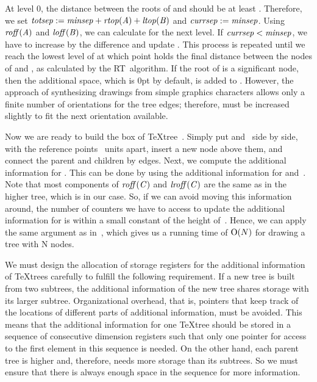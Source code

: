 At level 0, the distance between the roots of  and 
should be at least . Therefore, we set
${\it totsep\/}:={\it minsep\/} + {\it rtop\/}({\it A\/})
+ {\it ltop\/}({\it B\/})$ and ${\it currsep\/}:={\it minsep\/}$.
Using ${\it roff\/}({\it A\/})$ and ${\it loff\/}({\it B\/})$, we can
calculate  for the next level.
If ${\it currsep\/} < {\it minsep\/}$, we have to increase  by
the difference and update . This process is
repeated until we reach the lowest level of 
at which point  holds the final distance between the
nodes of  and , as calculated by the RT~algorithm.
If the root of  is a significant node, then the additional space,
which is 0pt by default, is added to .
However, the approach of synthesizing
drawings from simple graphics characters allows only a finite
number of orientations for the tree edges; therefore, 
must be increased slightly to fit the next orientation
available.

Now we are ready to build the box of \TeX{}tree~.
Simply put  and~ side by side, with the reference
points ~units apart, insert a new node
above them, and connect the parent and children by edges.
Next, we compute the additional information
for . This can be done by using the additional information
for  and~.
Note that most components of ${\it roff\/}({\it C\/})$ and
${\it lroff\/}({\it C\/})$ are the same as in the higher tree, which
is  in our case.
So, if we can avoid moving this information around, 
the number of counters we have to access to update the additional information
for  is within a small constant of the height of~.
Hence, we can apply the same argument as
in~\cite{TidierTrees}, which gives
us a running time of ${\rm O}(N)$ for drawing a tree with N nodes.

We must design the allocation of storage registers for
the additional information of \TeX{}trees carefully to fulfill the
following requirement. If a new tree is built from
two subtrees, the additional information of the new tree
shares storage with its larger subtree.
Organizational overhead, that is,
pointers that keep track of the locations of different parts of additional
information, must be avoided.
This means that the additional information
for one \TeX{}tree should be stored in a sequence
of consecutive dimension registers
such that only one pointer for access to the first element
in this sequence is needed. On the other hand, each parent
tree is higher and, therefore, needs more storage than its subtrees.
So we must ensure that there is always enough space in the sequence
for more information.

